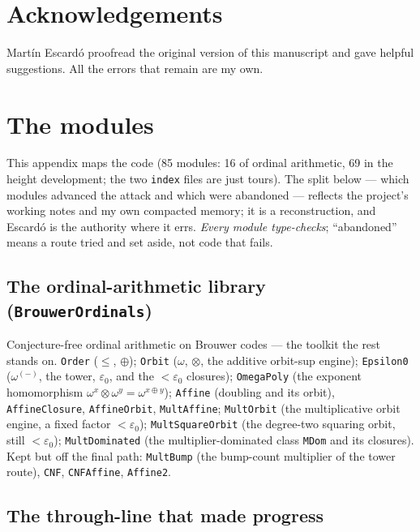 \documentclass[11pt]{article}
\newcommand{\eps}{\varepsilon_0}
\newcommand{\code}[1]{\texttt{#1}}
\theoremstyle{definition}
\begin{document}
\section*{Acknowledgements}

Martín Escardó proofread the original version of this manuscript and gave
helpful suggestions. All the errors that remain are my own.

\appendix
\sloppy

\section{The modules}

This appendix maps the code (85 modules: 16 of ordinal arithmetic, 69 in the
height development; the two \code{index} files are just tours). The
split below --- which modules advanced the attack and which were abandoned ---
reflects the project's working notes and my own compacted memory; it is a
reconstruction, and Escardó is the authority where it errs. \emph{Every module
type-checks}; ``abandoned'' means a route tried and set aside, not code that
fails.

\subsection{The ordinal-arithmetic library (\code{BrouwerOrdinals})}

Conjecture-free ordinal arithmetic on Brouwer codes --- the toolkit the rest
stands on. \code{Order} ($\le$, $\oplus$); \code{Orbit} ($\omega$, $\otimes$,
the additive orbit-sup engine); \code{Epsilon0} ($\omega^{(-)}$, the tower,
$\eps$, and the $<\eps$ closures); \code{OmegaPoly} (the exponent homomorphism
$\omega^x\otimes\omega^y=\omega^{x\oplus y}$); \code{Affine} (doubling and its
orbit), \code{AffineClosure}, \code{AffineOrbit}, \code{MultAffine};
\code{MultOrbit} (the multiplicative orbit engine, a fixed factor $<\eps$);
\code{MultSquareOrbit} (the degree-two squaring orbit, still $<\eps$);
\code{MultDominated} (the multiplier-dominated class \code{MDom} and its
closures). Kept but off the final path: \code{MultBump} (the bump-count
multiplier of the tower route), \code{CNF}, \code{CNFAffine}, \code{Affine2}.

\subsection{The through-line that made progress}
\end{document}
